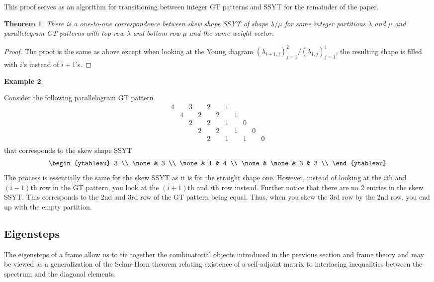\documentclass[10pt]{article}
\theoremstyle{plain}
\newtheorem{thm}{Theorem}[section]
\theoremstyle{definition}
\newtheorem{example}[thm]{Example}
\begin{document}
This proof serves as an algorithm for transitioning between integer GT patterns and SSYT for the remainder of the paper.

\begin{thm}\label{gt2ssyt2}
There is a one-to-one correspondence between skew shape SSYT of shape $\lambda / \mu$ for some integer partitions $\lambda$ and $\mu$ and parallelogram GT patterns with top row $\lambda$ and bottom row $\mu$ and the same weight vector. 
\end{thm}

\begin{proof}
The proof is the same as above except when looking at the Young diagram $(\lambda_{i+1,j})_{j=1}^2 / (\lambda_{1,j})_{j=1}^1 $, the resulting shape is filled with $i$'s instead of $i+1$'s.
\end{proof}

\begin{example}\label{exGT2SSYT}

Consider the following parallelogram GT pattern
\[
\begin{matrix}
4 & & 3 & & 2 & & 1 & & & &\\
& 4 & & 2 & & 2 & & 1 & & & \\
& & 2 & & 2 & & 1 & & 0 & &\\
& & & 2 & & 2 & & 1 & & 0 &\\ 
& & & & 2 & & 1 & & 1 & & 0 \\
\end{matrix}
\]
that corresponds to the skew shape SSYT
\[
\begin{ytableau}
3 \\
\none & 3 \\ 
\none & 1 & 4 \\
\none & \none & 3 & 3 \\
\end{ytableau}
\]
The process is essentially the same for the skew SSYT as it is for the straight shape one. However, instead of looking at the $i$th and $(i-1)$th row in the GT pattern, you look at the $(i+1)$th and $i$th row instead. Further notice that there are no $2$ entries in the skew SSYT. This corresponds to the 2nd and 3rd row of the GT pattern being equal. Thus, when you skew the 3rd row by the 2nd row, you end up with the empty partition. 
\end{example}

\subsection{Eigensteps}\label{eigensteps}
The eigensteps of a frame allow us to tie together the combinatorial objects introduced in the previous section and frame theory and may be viewed as a generalization of the Schur-Horn theorem \cite{Schurbackground, Hornbackground} relating existence of a self-adjoint matrix to interlacing inequalities between the spectrum and the diagonal elements. 
\end{document}
